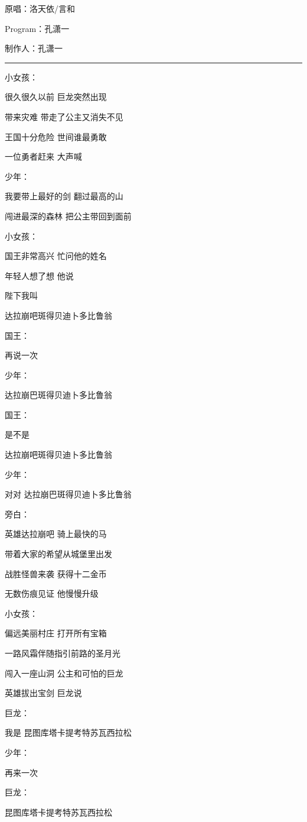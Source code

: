 \documentclass[]{ctexbook}
\begin{document}
原唱：洛天依/言和

Program：孔潇一

制作人：孔潇一

\begin{center}\rule{0.5\linewidth}{0.5pt}\end{center}

小女孩：

很久很久以前 巨龙突然出现

带来灾难 带走了公主又消失不见

王国十分危险 世间谁最勇敢

一位勇者赶来 大声喊

少年：

我要带上最好的剑 翻过最高的山

闯进最深的森林 把公主带回到面前

小女孩：

国王非常高兴 忙问他的姓名

年轻人想了想 他说

陛下我叫

达拉崩吧斑得贝迪卜多比鲁翁

国王：

再说一次

少年：

达拉崩巴斑得贝迪卜多比鲁翁

国王：

是不是

达拉崩吧斑得贝迪卜多比鲁翁

少年：

对对 达拉崩巴斑得贝迪卜多比鲁翁

旁白：

英雄达拉崩吧 骑上最快的马

带着大家的希望从城堡里出发

战胜怪兽来袭 获得十二金币

无数伤痕见证 他慢慢升级

小女孩：

偏远美丽村庄 打开所有宝箱

一路风霜伴随指引前路的圣月光

闯入一座山洞 公主和可怕的巨龙

英雄拔出宝剑 巨龙说

巨龙：

我是 昆图库塔卡提考特苏瓦西拉松

少年：

再来一次

巨龙：

昆图库塔卡提考特苏瓦西拉松
\end{document}
